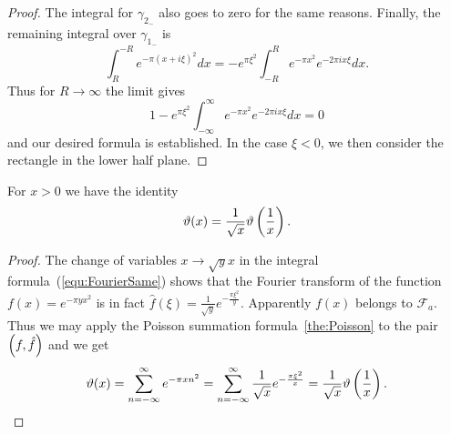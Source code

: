 \begin{proof}
	The integral for $\gamma_{2_-}$ also goes to zero for the same reasons. Finally, the remaining integral over $\gamma_{1_-}$ is
\begin{equation*}
	\int _{R} ^{-R} e^{-\pi (x + i \xi)^2} dx = -e^{\pi \xi^2} \int _{-R} ^R e^{-\pi x^2} e^{-2 \pi i x \xi} dx.
\end{equation*}
	Thus for $R \to \infty$ the limit gives
\begin{equation*}
	1 - e^{\pi \xi^2} \int _{-\infty} ^{\infty} e^{-\pi x^2} e^{-2 \pi i x \xi} dx = 0
\end{equation*}
	and our desired formula is established. In the case $\xi < 0$, we then consider the rectangle in the lower half plane.
\end{proof}


\begin{lemma}
	For $x > 0$ we have the identity
\begin{equation*}
	\vartheta(x) = \frac{1}{\sqrt{x}} \vartheta\left(\frac{1}{x}\right).
\end{equation*}
\end{lemma}
\begin{proof}
	The change of variables $x \to \sqrt{y} x$ in the integral formula~(\ref{equ:FourierSame}) shows that the Fourier transform of the function $f(x) = e^{-\pi y x^2}$ is in fact $\hat{f}(\xi) = \frac{1}{\sqrt{y}} e^{-\frac{\pi \xi^2}{y}}$. Apparently $f(x)$ belongs to $\mathcal{F}_a$. Thus we may apply the Poisson summation formula~\ref{the:Poisson} to the pair $\left(f, \hat{f}\right)$ and we get
\begin{equation*}
	\vartheta(x) = \sum _{n = -\infty} ^\infty e^{-\pi x n^2} = \sum _{n = -\infty} ^\infty \frac{1}{\sqrt{x}} e^{-\frac{\pi \xi^2}{x}} = \frac{1}{\sqrt{x}} \vartheta\left(\frac{1}{x}\right).
\end{equation*}
\end{proof}


